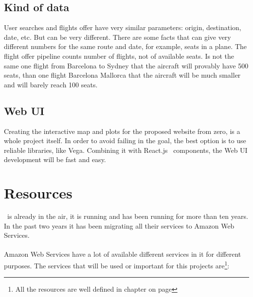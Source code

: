 \subsection{Kind of data}

User searches and flights offer have very similar parameters: origin, destination, date, etc. But can be very different. There are some facts that can give very different numbers for the same route and date, for example, seats in a plane. The flight offer pipeline counts number of flights, not of available seats. Is not the same one flight from Barcelona to Sydney that the aircraft will provably have 500 seats, than one flight Barcelona Mallorca that the aircraft will be much smaller and will barely reach 100 seats.

\subsection{Web UI}

Creating the interactive map and plots for the proposed website from zero, is a whole project itself. In order to avoid failing in the \textit{} goal, the best option is to use reliable libraries, like Vega\cite{vega}. Combining it with React.js \company\ components, the Web UI development will be fast and easy.


\section{Resources} \label{resources}

\company\ is already in the air, it is running and has been running for more than ten years. In the past two years it has been migrating all their services to Amazon Web Services\cite{aws}.
\\\\
Amazon Web Services have a lot of available different services in it for different purposes. The services that will be used or important for this projects are\footnote{All the resources are well defined in chapter  on page \pageref{chapter06}}:

